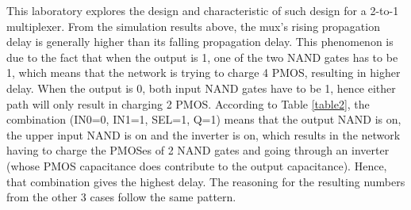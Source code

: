 \documentclass[letterpaper, 11pt]{article}
\begin{document}
This laboratory explores the design and characteristic of such design for a 2-to-1 multiplexer. From the simulation results above, the mux's rising propagation delay is generally higher than its falling propagation delay. This phenomenon is due to the fact that when the output is 1, one of the two NAND gates has to be 1, which means that the network is trying to charge 4 PMOS, resulting in higher delay. When the output is 0, both input NAND gates have to be 1, hence either path will only result in charging 2 PMOS. According to Table \ref{table2}, the combination (IN0=0, IN1=1, SEL=1, Q=1) means that the output NAND is on, the upper input NAND is on and the inverter is on, which results in the network having to charge the PMOSes of 2 NAND gates and going through an inverter (whose PMOS capacitance does contribute to the output capacitance). Hence, that combination gives the highest delay. The reasoning for the resulting numbers from the other 3 cases follow the same pattern.
\end{document}
